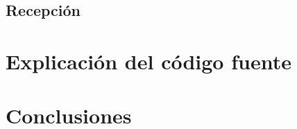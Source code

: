 \documentclass{article}
\begin{document}
\subsection{Recepción}


\section{Explicación del código fuente} 
 
\label{Elaboracion}



\section{Conclusiones} 
\label{Algoritmo}



\end{document}
